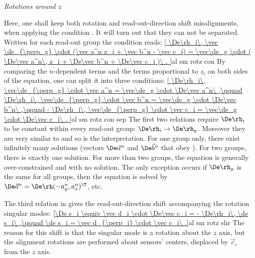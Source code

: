 
\baselineskip
\indent\em{Rotations around $z$}
\baselineskip

Here, one shall keep both rotation and read-out-direction shift misalignments, when applying the condition . It will turn out that they can not be separated. Written for each read-out group the condition reads:
\eqref{
	\De\rh_i\, \vec \de_{\perp_g} \cdot (\vec a^n z_i + \vec b^n - \vec c_i) =
	\vec\de_g \cdot (
		\De\vec a^n\, z_i +
		\De\vec b^n +
		\De\vec c_i
	)\ .
}{al sm rotz con}
By comparing the $n$-dependent terms and the terms proportional to $z_i$ on both sides of the equation, one can split it into three conditions:
\eqref{
	\De\rh_i\, \vec\de_{\perp_g} \cdot \vec a^n = \vec\de_g \cdot \De\vec a^n\ ,\qquad
	\De\rh_i\, \vec\de_{\perp_g} \cdot \vec b^n = \vec\de_g \cdot \De\vec b^n\ ,\qquad
	- \De\rh_i\, \vec\de_{\perp_g} \cdot \vec c_i = \vec\de_g \cdot \De\vec c_i\ .
}{al sm rotz con sep}
The first two relations require $\De\rh_i$ to be constant within every read-out group: $\De\rh_i \rightarrow \De\rh_g$. Moreover they are very similar to  and so is the interpretation. For one group only, there exist infinitely many solutions (vectors $\De\vec a^n$ and $\De\vec b^n$ that obey ). For two groups, there is exactly one solution. For more than two groups, the equation is generally over-constrained and with no solution. The only exception occurs if $\De\rh_g$ is the same for all groups, then the equation is solved by $\De\vec a^n = \De\rh (-a^n_y, a^n_x)^\T$, etc.

The third relation in  gives the read-out-direction shift accompanying the rotation singular modes:
\eqref{\De s_i \equiv \vec d_i \cdot \De\vec c_i = - \De\rh_i\, \de s_i\ ,\qquad \de s_i = \vec d_{\perp_i} \cdot \vec c_i\ .}{al sm rotz shr}
The reason for this shift is that the singular mode is a rotation about the $z$ axis, but the alignment rotations are performed about sensors' centers, displaced by $\vec c_i$ from the $z$ axis.

